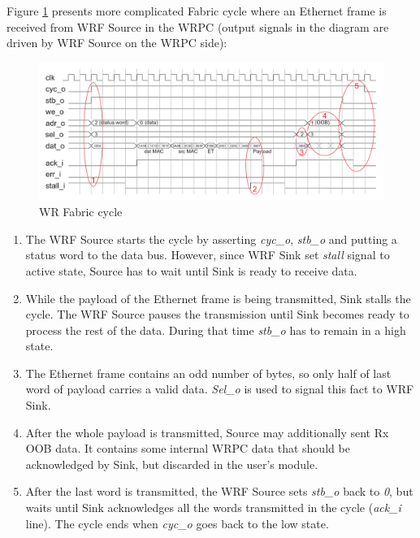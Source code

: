 Figure \ref{fig:fabric:cyc} presents more complicated Fabric cycle where an
Ethernet frame is received from WRF Source in the WRPC (output signals in the
diagram are driven by WRF Source on the WRPC side): 
\begin{figure}[ht]
  \begin{center}
    \includegraphics[width=\textwidth]{fig/basic_wrf_cycle.pdf}
    \caption{WR Fabric cycle}
    \label{fig:fabric:cyc}
  \end{center}
\end{figure}
\begin{enumerate}
  \item The WRF Source starts the cycle by asserting \emph{cyc\_o}, \emph{stb\_o}
    and putting a status word to the data bus. However, since WRF Sink set 
    \emph{stall} signal to active state, Source has to wait until Sink is ready
    to receive data.
  \item While the payload of the Ethernet frame is being transmitted, Sink
    stalls the cycle. The WRF Source pauses the transmission until Sink becomes
    ready to process the rest of the data. During that time \emph{stb\_o} has to
    remain in a high state.
  \item The Ethernet frame contains an odd number of bytes, so only half of last
    word of payload carries a valid data. \emph{Sel\_o} is used to signal this
    fact to WRF Sink.
  \item After the whole payload is transmitted, Source may additionally sent Rx
    OOB data. It contains some internal WRPC data that should be acknowledged
    by Sink, but discarded in the user's module.
  \item After the last word is transmitted, the WRF Source sets \emph{stb\_o} back
    to \emph{0}, but waits until Sink acknowledges all the words transmitted in
    the cycle (\emph{ack\_i} line). The cycle ends when \emph{cyc\_o} goes back
    to the low state.
\end{enumerate}

